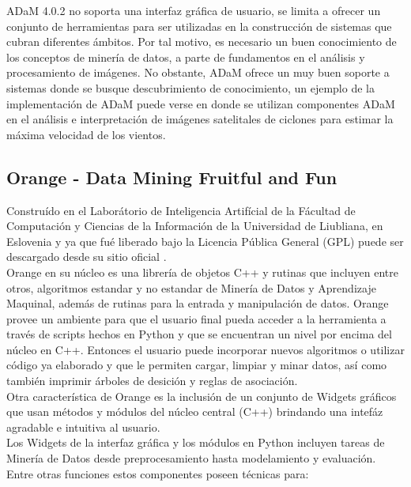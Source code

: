 ADaM 4.0.2 no soporta una interfaz gr\'afica de usuario, se limita a ofrecer un conjunto de herramientas para ser
utilizadas en la construcci\'on de sistemas que cubran diferentes \'ambitos.  Por tal motivo, es necesario un buen
conocimiento de los conceptos de miner\'ia de datos, a parte de fundamentos en el an\'alisis y procesamiento de
im\'agenes.  No obstante, ADaM ofrece un muy buen soporte a sistemas donde se busque descubrimiento de
conocimiento, un ejemplo de la implementaci\'on de ADaM puede verse en \cite{adamImpl} donde se utilizan
componentes ADaM en el an\'alisis e interpretaci\'on de im\'agenes satelitales de ciclones para estimar la
m\'axima velocidad de los vientos.

\subsection{Orange - Data Mining Fruitful and Fun}
Constru\'ido en el Labor\'atorio de Inteligencia Artif\'icial de la F\'acultad de Computaci\'on y Ciencias de la
Informaci\'on de la Universidad de Liubliana, en Eslovenia y ya que fu\'e liberado bajo la Licencia P\'ublica
General (GPL) puede ser descargado desde su sitio oficial \cite{oran}.\\

Orange \cite{oranwp} en su n\'ucleo es una librer\'ia de objetos C++ y rutinas que incluyen entre otros,
algoritmos estandar y no estandar de Miner\'ia de Datos y Aprendizaje Maquinal, adem\'as de rutinas para la
entrada y manipulaci\'on de datos. Orange provee un ambiente para que el usuario final pueda acceder a la
herramienta a trav\'es de scripts hechos en Python y que se encuentran un nivel por encima del n\'ucleo en  C++.
Entonces el usuario puede incorporar nuevos algoritmos o utilizar c\'odigo ya elaborado y que le permiten cargar,
limpiar y minar datos, as\'i como tambi\'en imprimir \'arboles de desici\'on y reglas de asociaci\'on.\\

Otra caracter\'istica de Orange es la inclusi\'on de un conjunto de Widgets gr\'aficos que usan m\'etodos y
m\'odulos del n\'ucleo central (C++) brindando una intef\'az agradable e intuitiva al usuario.\\

Los Widgets de la interfaz gr\'afica y los m\'odulos en Python incluyen tareas de Miner\'ia de Datos desde 
preprocesamiento hasta modelamiento y evaluaci\'on. Entre otras funciones estos componentes poseen t\'ecnicas
para:

